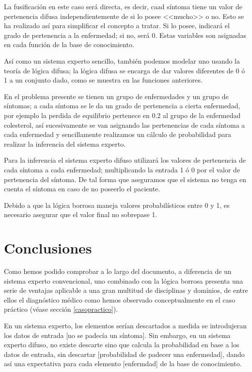 \documentclass[a4paper, 11pt, titlepage]{article}
\begin{document}
        La fusificación en este caso será directa, es decir, caad síntoma tiene un valor de pertenencia difusa
        independientemente de si lo posee <<mucho>> o no. Esto se ha realizado así para simplificar el concepto 
        a tratar. Si lo posee, indicará el grado de pertenencia a la enfermedad; si no, será 0. Estas variables 
        son asignadas en cada función de la base de conocimiento.

        Así como un sistema experto sencillo, también podemos modelar uno usando la teoría de lógica difusa; 
        la lógica difusa se encarga de dar valores diferentes de 0 ó 1 a un conjunto dado, como se muestra 
        en las funciones anteriores.

        En el problema presente se tienen un grupo de enfermedades y un grupo de síntomas; a cada síntoma 
        se le da un grado de pertenencia a cierta enfermedad, por ejemplo la perdida de equilibrio pertenece 
        en 0.2 al grupo de la enfermedad colesterol, así sucesivamente se van asignando las pertenencias de
        cada síntoma a cada enfermedad y sencillamente realizamos un cálculo de probabilidad para realizar 
        la inferencia del sistema experto.

        Para la inferencia el sistema experto difuso utilizará los valores de pertenencia de cada síntoma 
        a cada  enfermedad; multiplicando la entrada 1 ó 0 por el valor de pertenencia del síntoma. De tal 
        forma que aseguramos que el sistema no tenga en cuenta el síntoma en caso de no poseerlo el paciente.  

        Debido a que la lógica borrosa maneja valores probabilísticos entre 0 y 1, es necesario asegurar que el valor 
        final no sobrepase 1. 

\section{Conclusiones}

    Como hemos podido comprobar a lo largo del documento, a diferencia de un sistema experto convencional, uno 
    combinado con la lógica borrosa presenta una serie de ventajas aplicable a una gran multitud de disciplinas 
    y dominios, de entre ellos el diagnóstico médico como hemos observado conceptualmente en el caso práctico 
    (véase sección \ref{casopractico}).

    En un sistema experto, los elementos serían descartados a medida se introdujeran los datos de entrada [no 
    se padecía un síntoma]. Sin embargo, en un sistema experto difuso, no existe descarte sino que calcula 
    la probabilidad en base a los datos de entrada, sin descartar [probabilidad de padecer una enfermedad], dando 
    así una expectativa para cada elemento [enfermdad] de la base de conocimiento.
    
\end{document}
